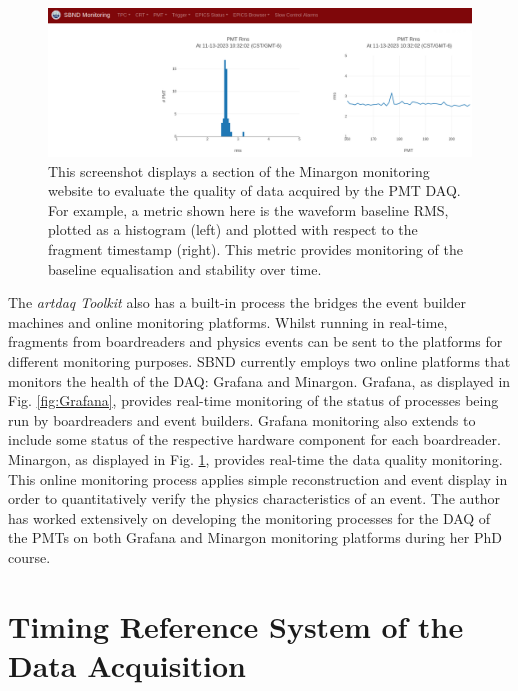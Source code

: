 \begin{figure}[htbp!] 
\centering    
\includegraphics[width=1.0\textwidth]{Minargon}
\caption[Minargon]{
This screenshot displays a section of the Minargon monitoring website to evaluate the quality of data acquired by the PMT DAQ.
For example, a metric shown here is the waveform baseline RMS, plotted as a histogram (left) and plotted with respect to the fragment timestamp (right).
This metric provides monitoring of the baseline equalisation and stability over time.
}
\label{fig:Minargon}
\end{figure}

The \textit{artdaq Toolkit} also has a built-in process the bridges the event builder machines and online monitoring platforms.
Whilst running in real-time, fragments from boardreaders and physics events can be sent to the platforms for different monitoring purposes.
SBND currently employs two online platforms that monitors the health of the DAQ: Grafana and Minargon.
Grafana, as displayed in Fig. \ref{fig:Grafana}, provides real-time monitoring of the status of processes being run by boardreaders and event builders. 
Grafana monitoring also extends to include some status of the respective hardware component for each boardreader.
Minargon, as displayed in Fig. \ref{fig:Minargon}, provides real-time the data quality monitoring. 
This online monitoring process applies simple reconstruction and event display in order to quantitatively verify the physics characteristics of an event. 
The author has worked extensively on developing the monitoring processes for the DAQ of the PMTs on both Grafana and Minargon monitoring platforms during her PhD course. 

\section{Timing Reference System of the Data Acquisition}
\label{sec4TimeRef}

